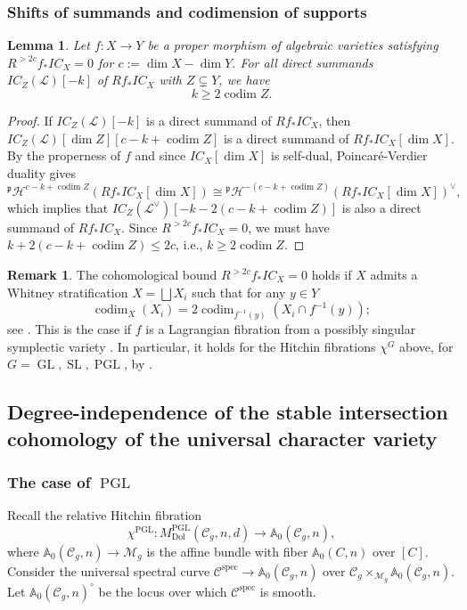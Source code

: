\documentclass[11pt,reqno]{amsart}
\theoremstyle{plain} %
\newtheorem{lemma}[theorem]{Lemma}
\theoremstyle{definition}
\newtheorem{remark}[theorem]{Remark}
\newcommand{\M}{\mathcal{M}}
\newcommand{\C}{\mathcal{C}}
\DeclareMathOperator{\GL}{GL}
\DeclareMathOperator{\SL}{SL}
\DeclareMathOperator{\PGL}{PGL}
\newcommand{\Dol}{\mathrm{Dol}}
\newcommand{\IC}{IC}
\renewcommand{\AA}{\mathbb{A}}
\DeclareMathOperator{\codim}{codim}
\DeclareMathOperator{\spec}{spec}
\begin{document}
\subsubsection{Shifts of summands and codimension of supports}
\begin{lemma}\label{propboundcoeff}
Let $f \colon X \to Y$ be a proper
morphism of algebraic varieties satisfying $R^{> 2c}f_* \IC_X =0$ for $c := \dim X - \dim Y$. For all direct summands $\IC_{Z}(\mathcal{L})[-k]$ of $Rf_* \IC_X$ with $Z \subsetneq Y$, we have 
\[
k\geq 2 \codim Z.
\]
\end{lemma}
\begin{proof}
If $\IC_{Z}(\mathcal{L})[-k]$ is a direct summand of $Rf_* \IC_X$, then $\IC_{Z}(\mathcal{L})[\dim Z][c-k+\codim Z]$ is a direct summand of $Rf_* \IC_X[\dim X]$. By the properness of $f$ and since $\IC_X[\dim X]$ is self-dual, Poincar\'{e}-Verdier duality gives 
\[{}^{\mathfrak{p}} \mathcal{H}^{c-k+\codim Z}(Rf_* \IC_X[\dim X]) \cong {}^{\mathfrak{p}} \mathcal{H}^{-(c-k+\codim Z)}(Rf_* \IC_X[\dim X])^\vee,\]
which implies that $\IC_{Z}(\mathcal{L}^\vee)[-k-2(c-k+\codim Z)]$ is also a direct summand of $Rf_* \IC_X$. Since $R^{> 2c}f_* \IC_X =0$, we must have $k+2(c-k+\codim Z) \leq 2c$, i.e., $k\geq 2 \codim Z$. 
\end{proof}

\begin{remark}\label{rmkcohomologicalbound}
The cohomological bound $R^{> 2c}f_* \IC_X =0$ holds if $X$ admits a Whitney stratification $X = \bigsqcup X_{i}$ such that for any $y \in Y$
\[
\codim_{X}(X_{i}) = 2 \codim_{f^{-1}(y)}(X_{i}\cap f^{-1}(y));
\]
 see \cite[Proposition 3.3]{MM}. This is the case if $f$ is a Lagrangian fibration from a possibly singular symplectic variety \cite[Proposition 3.6]{MM}. In particular, it holds for the Hitchin fibrations $\chi^G$ above, for $G=\GL,\SL,\PGL$, by \cite[Proposition 1.5]{dCFHM}. 
\end{remark}

\subsection{Degree-independence of the stable intersection cohomology of the universal character variety}
\subsubsection{The case of $\PGL$}
Recall the relative Hitchin fibration \[\chi^{\PGL}\colon M^{\PGL}_{\Dol}(\C_g,n,d) \to \AA_0(\C_g,n),\] where $\AA_0(\C_g,n) \to \M_g$ is the affine bundle with fiber $\AA_0(C,n)$ over $[C]$. 
Consider the universal spectral curve $\mathscr C^{\spec} \to \AA_0(\C_g,n)$ over $\C_g \times_{\M_g} \AA_0(\C_g,n)$. Let $\AA_0(\C_g,n)^\circ$ be the locus over which $\mathscr C^{\spec}$ is smooth.
\end{document}
